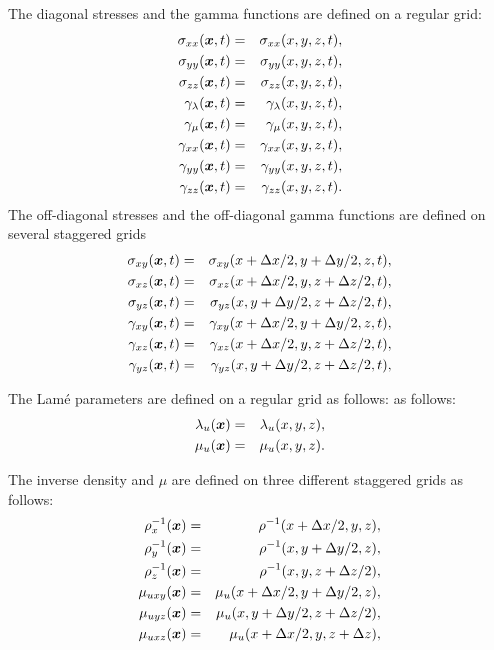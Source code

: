 \documentclass[11pt]{article}
\begin{document}
{The diagonal stresses and the gamma functions are defined on a regular grid:
\begin{eqnarray}
   \sigma_{xx}(\mbox{\boldmath $x$}, t) & = & \sigma_{xx}( x, y,z, t), \\
   \sigma_{yy}(\mbox{\boldmath $x$}, t) & = & \sigma_{yy}(x, y, z, t), \\
   \sigma_{zz}(\mbox{\boldmath $x$}, t) & = & \sigma_{zz}(x, y, z, t), \\ 
   \gamma_{\lambda}(\mbox{\boldmath $x$}, t) & = & \gamma_{\lambda}(x, y,  z, t), \\ 
   \gamma_{\mu}(\mbox{\boldmath $x$}, t) & = & \gamma_{\mu}(x, y, z, t), \\ 
   \gamma_{xx}(\mbox{\boldmath $x$}, t) & = & \gamma_{xx}(x, y, z,  t), \\ 
   \gamma_{yy}(\mbox{\boldmath $x$}, t) & = & \gamma_{yy}( x, y, z,  t), \\ 
   \gamma_{zz}(\mbox{\boldmath $x$}, t) & = & \gamma_{zz}(x, y, z,  t). 
\end{eqnarray}
%
The off-diagonal stresses and the off-diagonal gamma functions are defined on
several staggered grids
%
\begin{eqnarray}
   \sigma_{xy}(\mbox{\boldmath $x$}, t) & = & \sigma_{xy}(x +\Delta x/2, y + \Delta y/2, z, t), \\
   \sigma_{xz}(\mbox{\boldmath $x$}, t) & = & \sigma_{xz}(x +\Delta x/2, y,z + \Delta z/2,  t), \\
   \sigma_{yz}(\mbox{\boldmath $x$}, t) & = & \sigma_{yz}(x, y + \Delta y/2, z+\Delta z/2,  t), \\
   \gamma_{xy}(\mbox{\boldmath $x$}, t) & = & \gamma_{xy}(x +\Delta x/2, y + \Delta y/2, z, t), \\
   \gamma_{xz}(\mbox{\boldmath $x$}, t) & = & \gamma_{xz}(x +\Delta x/2, y,z + \Delta z/2,  t), \\
   \gamma_{yz}(\mbox{\boldmath $x$}, t) & = & \gamma_{yz}(x, y + \Delta y/2, z+\Delta z/2,  t), \\
\end{eqnarray}
%

The Lam\'{e} parameters are defined on a regular grid as follows:
as follows:
%
\begin{eqnarray}
   \lambda_u(\mbox{\boldmath $x$}) & = & \lambda_u(x,y,z),\\
   \mu_u(\mbox{\boldmath $x$})     & = & \mu_u(x,y, z).
\end{eqnarray}

The inverse density and $\mu$ are defined  on three different staggered grids as follows:
\begin{eqnarray}
   \rho_x^{-1}(\mbox{\boldmath $x$}) & = & \rho^{-1}(x+\Delta x/2, y, z),\\
   \rho_y^{-1}(\mbox{\boldmath $x$}) & = & \rho^{-1}(x,y+\Delta y/2, z),\\
   \rho_z^{-1}(\mbox{\boldmath $x$}) & = &\rho^{-1}(x,y,z+\Delta z/2),\\
   \mu_{uxy}(\mbox{\boldmath $x$}) & = &   \mu_u(x+\Delta x/2, y+\Delta y/2, z),\\
   \mu_{uyz}(\mbox{\boldmath $x$}) & = &   \mu_u(x, y+\Delta y/2, z+\Delta z/2),\\
   \mu_{uxz}(\mbox{\boldmath $x$}) & = &   \mu_u(x+\Delta x/2, y,z+\Delta z),\\
\end{eqnarray}

}
\end{document}
